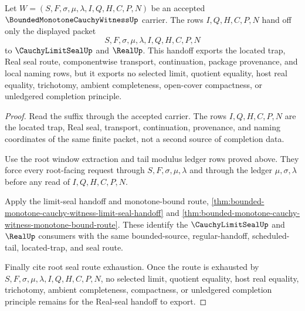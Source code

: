 \begin{theorem}\label{thm:bounded-monotone-cauchy-witness-root-real-seal-nonescape}
Let $W=(S,F,\sigma,\mu,\lambda,I,Q,H,C,P,N)$ be an accepted $\BoundedMonotoneCauchyWitnessUp$ carrier. The rows $I,Q,H,C,P,N$ hand off only the displayed packet
$$
S,F,\sigma,\mu,\lambda,I,Q,H,C,P,N
$$
to $\CauchyLimitSealUp$ and $\RealUp$. This handoff exports the located trap, Real seal route, componentwise transport, continuation, package provenance, and local naming rows, but it exports no selected limit, quotient equality, host real equality, trichotomy, ambient completeness, open-cover compactness, or unledgered completion principle.
\end{theorem}
\begin{proof}
Read the suffix through the accepted carrier. The rows $I,Q,H,C,P,N$ are the located trap, Real seal, transport, continuation, provenance, and naming coordinates of the same finite packet, not a second source of completion data.

Use the root window extraction and tail modulus ledger rows proved above. They force every root-facing request through $S,F,\sigma,\mu,\lambda$ and through the ledger $\mu,\sigma,\lambda$ before any read of $I,Q,H,C,P,N$.

Apply the limit-seal handoff and monotone-bound route, \autoref{thm:bounded-monotone-cauchy-witness-limit-seal-handoff} and \autoref{thm:bounded-monotone-cauchy-witness-monotone-bound-route}. These identify the $\CauchyLimitSealUp$ and $\RealUp$ consumers with the same bounded-source, regular-handoff, scheduled-tail, located-trap, and seal route.

Finally cite root seal route exhaustion. Once the route is exhausted by $S,F,\sigma,\mu,\lambda,I,Q,H,C,P,N$, no selected limit, quotient equality, host real equality, trichotomy, ambient completeness, compactness, or unledgered completion principle remains for the Real-seal handoff to export.
\end{proof}


